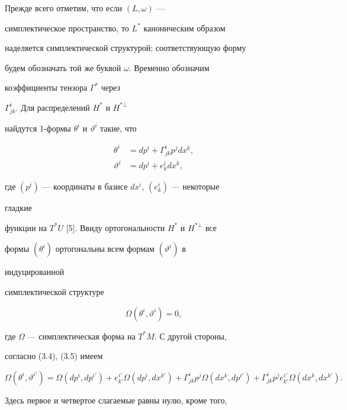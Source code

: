 \begin{pf} Прежде всего отметим, что если $(L,\omega)$ --- 


симплектическое пространство, то $L^*$ каноническим образом  


наделяется симплектической структурой; соответствующую форму 


будем обозначать той же буквой $\omega$. Временно обозначим  


коэффициенты тензора $\Gamma^*$ через 


$\Gamma^i_{jk}$. Для распределений $H^*$ и $H^{*\bot}$  


найдутся 1-формы $\theta^i$ и $\vartheta^i$ такие, что 


\begin{align} 


\theta^i&=dp^i+\Gamma^i_{jk}p^j dx^k, \\ 


\vartheta^i&=dp^i+e^i_k dx^k, 


\end{align} 


где $(p^i)$ --- координаты в базисе $dx^i$, $(e^i_k)$ --- некоторые 


гладкие 


функции на $T^*U$ [5]. Ввиду ортогональности $H^*$ и $H^{*\bot}$ все 


формы $(\theta^i)$ ортогональны всем формам $(\vartheta^i)$ в 


индуцированной 


симплектической структуре 


\begin{equation} 


\Omega(\theta^i,\vartheta^i)=0, 


\end{equation} 


где $\Omega$ --- симплектическая форма на $T^*M$. С другой стороны,  


согласно (3.4), (3.5) имеем 


$$ 


\Omega(\theta^i,\vartheta^{i'})=\Omega(dp^i,dp^{i'})+ 


e^{i'}_{k'}\Omega(dp^i,dx^{k'})+ 


\Gamma^i_{jk}p^j\Omega(dx^k,dp^{i'})+ 


\Gamma^i_{jk}p^j e^{i'}_{k'}\Omega(dx^k,dx^{k'}). 


$$ 


Здесь первое и четвертое слагаемые равны нулю, кроме того, 



\end{pf}
